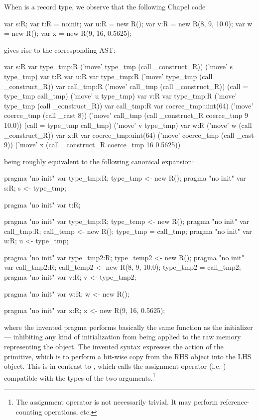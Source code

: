 When  is a record type, we observe that the following Chapel code
\begin{chapel}
  var s:R;
  var t:R = noinit;
  var u:R = new R();
  var v:R = new R(8, 9, 10.0);
  var w = new R();
  var x = new R(9, 16, 0.5625);
\end{chapel}
\noindent
gives rise to the corresponding AST:
\begin{numberedchapel}
    var s:R
    {
      var type_tmp:R
      ('move' type_tmp (call _construct_R))
      ('move' s type_tmp)
    }
    var t:R
    var u:R
    {
      var type_tmp:R
      ('move' type_tmp (call _construct_R))
      var call_tmp:R
      ('move' call_tmp (call _construct_R))
      (call = type_tmp call_tmp)
      ('move' u type_tmp)
    }
    var v:R
    {
      var type_tmp:R
      ('move' type_tmp (call _construct_R))
      var call_tmp:R
      var coerce_tmp:uint(64)
      ('move' coerce_tmp (call _cast 8))
      ('move' call_tmp (call _construct_R coerce_tmp 9 10.0))
      (call = type_tmp call_tmp)
      ('move' v type_tmp)
    }
    var w:R
    ('move' w (call _construct_R))
    var x:R
    var coerce_tmp:uint(64)
    ('move' coerce_tmp (call _cast 9))
    ('move' x (call _construct_R coerce_tmp 16 0.5625))
\end{numberedchapel}
\noindent
being roughly equivalent to the following canonical expansion:
\begin{chapel}
  pragma "no init" var type_tmp:R; type_tmp <- new R();
  pragma "no init" var s:R; s <- type_tmp;

  pragma "no init" var t:R;

  pragma "no init" var type_tmp:R; type_temp <- new R();
  pragma "no init" var call_tmp:R; call_temp <- new R();
  type_tmp = call_tmp;
  pragma "no init" var u:R; u <- type_tmp;

  pragma "no init" var type_tmp2:R; type_temp2 <- new R();
  pragma "no init" var call_tmp2:R; call_temp2 <- new R(8, 9, 10.0);
  type_tmp2 = call_tmp2;
  pragma "no init" var v:R; v <- type_tmp2;

  pragma "no init" var w:R; w <- new R();

  pragma "no init" var x:R; x <- new R(9, 16, 0.5625);
\end{chapel}
\noindent
where the invented pragma  performs basically the same function as the
 initializer --- inhibiting any kind of initialization from being applied
to the raw memory representing the object.  The invented syntax \chpl{<-} expresses the
action of the  primitive, which is to perform a bit-wise copy from the RHS
object into the LHS object.  This is in contrast to \chpl{=}, which calls the assignment
operator (i.e. ) compatible with the types of the two arguments.\footnote{The
assignment operator is not necessarily trivial.  It may perform reference-counting
operations, etc.}

